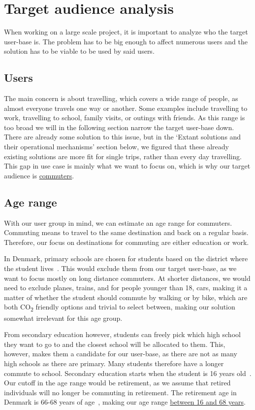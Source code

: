 \section{Target audience analysis}\label{sec:target-audience-analysis}

When working on a large scale project, it is important to analyze who the target user-base is.
The problem has to be big enough to affect numerous users and the solution has to be viable to be used by said
users.

\subsection{Users}\label{subsec:users}

The main concern is about travelling, which covers a wide range of people, as almost everyone travels one way or
another.
Some examples include travelling to work, travelling to school, family visits, or outings with friends.
As this range is too broad we will in the following section narrow the target user-base down.
There are already some solution to this issue, but in the `Extant solutions and their operational mechanisms' section
below, we figured that these already existing solutions are more fit for single trips, rather than every day travelling.
This gap in use case is mainly what we want to focus on, which is why our target audience is \underline{commuters}.

\subsection{Age range}\label{subsec:age-range}

With our user group in mind, we can estimate an age range for commuters.
Commuting means to travel to the same destination and back on a regular basis.
Therefore, our focus on destinations for commuting are either education or work.

In Denmark, primary schools are chosen for students based on the district where the student lives~\cite{primary_school}.
This would exclude them from our target user-base, as we want to focus mostly on long distance commuters.
At shorter distances, we would need to exclude planes, trains, and for people younger than 18, cars, making it a matter
of whether the student should commute by walking or by bike, which are both \unit{CO_{2}} friendly options and trivial
to select between, making our solution somewhat irrelevant for this age group.

From secondary education however, students can freely pick which high school they want to go to and the closest school
will be allocated to them.
This, however, makes them a candidate for our user-base, as there are not as many high schools as there are primary.
Many students therefore have a longer commute to school.
Secondary education starts when the student is 16 years old~\cite{secondary_school}.
Our cutoff in the age range would be retirement, as we assume that retired individuals will no longer be commuting in
retirement.
The retirement age in Denmark is 66-68 years of age~\cite{retirement}, making our age range
\underline{between 16 and 68 years}.

